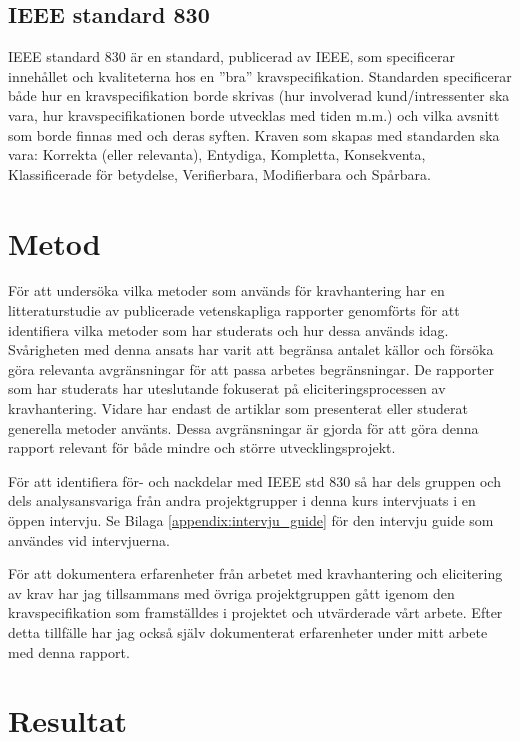 \subsection{IEEE standard 830}
IEEE standard 830 är en standard, publicerad av IEEE, som specificerar innehållet och kvaliteterna hos en ”bra” kravspecifikation.\cite{ieee1998ieee} Standarden specificerar både hur en kravspecifikation borde skrivas (hur involverad kund/intressenter ska vara, hur kravspecifikationen borde utvecklas med tiden m.m.) och vilka avsnitt som borde finnas med och deras syften. Kraven som skapas med standarden ska vara: Korrekta (eller relevanta), Entydiga, Kompletta, Konsekventa, Klassificerade för betydelse, Verifierbara, Modifierbara och Spårbara.

\section{Metod}
\label{sec:method-jannering}

För att undersöka vilka metoder som används för kravhantering har en litteraturstudie av publicerade vetenskapliga rapporter genomförts för att identifiera vilka metoder som har studerats och hur dessa används idag. Svårigheten med denna ansats har varit att begränsa antalet källor och försöka göra relevanta avgränsningar för att passa arbetes begränsningar. De rapporter som har studerats har uteslutande fokuserat på eliciteringsprocessen av kravhantering. Vidare har endast de artiklar som presenterat eller studerat generella metoder använts. Dessa avgränsningar är gjorda för att göra denna rapport relevant för både mindre och större utvecklingsprojekt.
  
För att identifiera för- och nackdelar med IEEE std 830 \cite{ieee1998ieee} så har dels gruppen och dels analysansvariga från andra projektgrupper i denna kurs intervjuats i en öppen intervju. Se Bilaga \ref{appendix:intervju_guide} för den intervju guide som användes vid intervjuerna.

För att dokumentera erfarenheter från arbetet med kravhantering och elicitering av krav har jag tillsammans med övriga projektgruppen gått igenom den kravspecifikation som framställdes i projektet och utvärderade vårt arbete. Efter detta tillfälle har jag också själv dokumenterat erfarenheter under mitt arbete med denna rapport.




\section{Resultat}
\label{sec:results-jannering}

